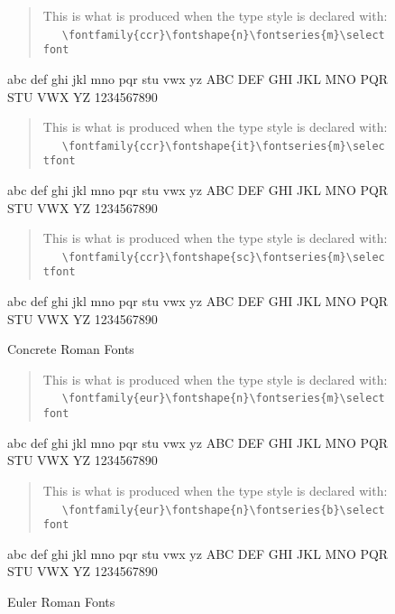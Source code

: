 \begin{figure}
\begin{singlespace}
\begin{verse}
This is what is produced when the type  style is declared with:\\
\ \ \ \verb+\fontfamily{ccr}\fontshape{n}\fontseries{m}\selectfont+\\
\end{verse}
{\selectfont
abc def ghi jkl mno pqr stu vwx yz ABC DEF GHI JKL MNO PQR STU
VWX YZ 1234567890\par}
\vspace{1em}
\begin{verse}
This is what is produced when the type  style is declared with:\\
\ \ \ \verb+\fontfamily{ccr}\fontshape{it}\fontseries{m}\selectfont+
\end{verse}
{\selectfont
abc def ghi jkl mno pqr stu vwx yz ABC DEF GHI JKL MNO PQR STU
VWX YZ 1234567890\par}
\vspace{1em}
\begin{verse}
This is what is produced when the type  style is declared with:\\
\ \ \ \verb+\fontfamily{ccr}\fontshape{sc}\fontseries{m}\selectfont+\\
\end{verse}
{\selectfont
abc def ghi jkl mno pqr stu vwx yz ABC DEF GHI JKL MNO PQR STU
VWX YZ 1234567890\par}
\vspace{1em}
\caption{Concrete Roman Fonts}
\label{fig:ccr}
\end{singlespace}
\end{figure}
 
\begin{figure}
\begin{singlespace}
\begin{verse}
This is what is produced when the type style is declared with:\\
\ \ \ \verb+\fontfamily{eur}\fontshape{n}\fontseries{m}\selectfont+\\
\end{verse}
{\selectfont
abc def ghi jkl mno pqr stu vwx yz ABC DEF GHI JKL MNO PQR STU
VWX YZ 1234567890\par}
\vspace{1em}
\begin{verse}
This is what is produced when the type style is declared with:\\
\ \ \ \verb+\fontfamily{eur}\fontshape{n}\fontseries{b}\selectfont+\\
\end{verse}
{\selectfont
abc def ghi jkl mno pqr stu vwx yz ABC DEF GHI JKL MNO PQR STU
VWX YZ 1234567890\par}
\vspace{1em}
\caption{Euler Roman Fonts}
\label{fig:eur}
\end{singlespace}
\end{figure}
 
